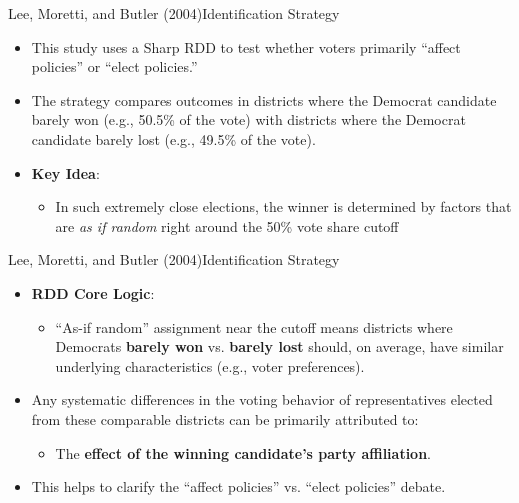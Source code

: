 \documentclass[dvipsnames,hyperref={pdfpagelabels=false}]{beamer}
\begin{document}
\begin{frame}{Lee, Moretti, and Butler (2004)}{Identification Strategy}
	\begin{itemize}
		\item This study uses a Sharp RDD to test whether voters primarily ``affect policies'' or ``elect policies.''
		\vspace{0.2cm}
		\item The strategy compares outcomes in districts where the Democrat candidate barely won (e.g., 50.5\% of the vote) with districts where the Democrat candidate barely lost (e.g., 49.5\% of the vote).
		\vspace{0.2cm}
		\item \textbf{Key Idea}: 
			\begin{itemize}
		\item In such extremely close elections, the winner is determined by factors that are \textit{as if random} right around the 50\% vote share cutoff
			\end{itemize}
	\end{itemize}
\end{frame}




\begin{frame}{Lee, Moretti, and Butler (2004)}{Identification Strategy}
	\begin{itemize}
		\item \textbf{RDD Core Logic}: 
				\vspace{0.3cm} %
			\begin{itemize}
		\item ``As-if random'' assignment near the cutoff means districts where Democrats \textbf{barely won} vs. \textbf{barely lost} should, on average, have similar underlying characteristics (e.g., voter preferences).
			\end{itemize}
		\vspace{0.3cm} %
		\item Any systematic differences in the voting behavior of representatives elected from these comparable districts can be primarily attributed to: 
		\vspace{0.3cm} %
		\begin{itemize}
		\item The \textbf{effect of the winning candidate's party affiliation}.
		\vspace{0.3cm}
			\end{itemize}
		\item This helps to clarify the ``affect policies'' vs. ``elect policies'' debate.
	\end{itemize}
\end{frame}
\end{document}
